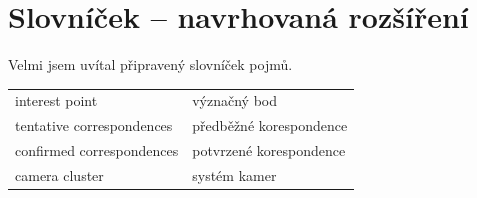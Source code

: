 \documentclass[11pt,oneside,a4paper,pdftex]{article}   %
\begin{document}
\section*{Slovníček -- navrhovaná rozšíření}

	Velmi jsem uvítal připravený slovníček pojmů.

	\begin{tabular*}{1\paperwidth}{p{}p{}}
		interest point				& význačný bod				\\
		tentative correspondences	& předběžné korespondence	\\
		confirmed correspondences	& potvrzené korespondence	\\
		camera cluster				& systém kamer				\\
	\end{tabular*}
	





%
%
\printbibliography
%
\end{document}
